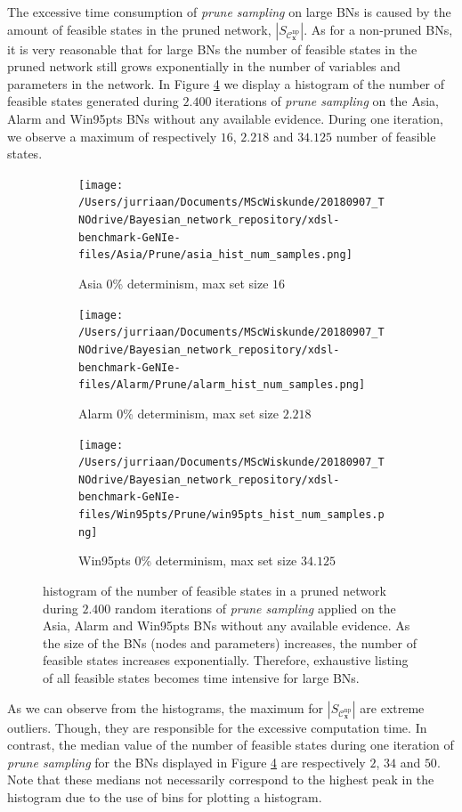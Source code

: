 \documentclass[a4paper, twoside, 11pt]{report}
\newcommand{\bfx}{{\mathbf{x}}}
\newcommand{\C}{{\mathcal C}}
\theoremstyle{plain}
\theoremstyle{definition}
\theoremstyle{remark}
\newcommand{\ps}{\textit{prune sampling }}
\begin{document}
The excessive time consumption of \ps on large BNs is caused by the amount of feasible states in the pruned network, $|S_{\C_\bfx^{\text{np}}}|$. As for a non-pruned BNs, it is very reasonable that for large BNs the number of feasible states in the pruned network still grows exponentially in the number of variables and parameters in the network. In Figure \ref{results4} we display a histogram of the number of feasible states generated during $2.400$ iterations of \ps on the Asia, Alarm and Win95pts BNs without any available evidence. During one iteration, we observe a maximum of respectively $16$, $2.218$ and $34.125$ number of feasible states.
\begin{figure}[h!]
\centering
\captionsetup[subfigure]{justification=centering}

\begin{subfigure}{.3\linewidth}
\texttt{[image: /Users/jurriaan/Documents/MScWiskunde/20180907\_TNOdrive/Bayesian\_network\_repository/xdsl-benchmark-GeNIe-files/Asia/Prune/asia\_hist\_num\_samples.png]}
\caption{Asia 0\% determinism, max set size $16$}%
\label{asia_ev}%
\end{subfigure}\hfill%
\begin{subfigure}{.3\linewidth}
\texttt{[image: /Users/jurriaan/Documents/MScWiskunde/20180907\_TNOdrive/Bayesian\_network\_repository/xdsl-benchmark-GeNIe-files/Alarm/Prune/alarm\_hist\_num\_samples.png]}
\caption{Alarm 0\% determinism, max set size $2.218$}%
\label{alarm_ev}%
\end{subfigure}\hfill%
\begin{subfigure}{.3\linewidth}
\texttt{[image: /Users/jurriaan/Documents/MScWiskunde/20180907\_TNOdrive/Bayesian\_network\_repository/xdsl-benchmark-GeNIe-files/Win95pts/Prune/win95pts\_hist\_num\_samples.png]}
\caption{Win95pts 0\% determinism, max set size $34.125$}%
\label{win95pts_ev}%
\end{subfigure}\hfill%
\vspace{0.75pc}
\caption{histogram of the number of feasible states in a pruned network during $2.400$ random iterations of \ps applied on the Asia, Alarm and Win95pts BNs without any available evidence. As the size of the BNs (nodes and parameters) increases, the number of feasible states increases exponentially. Therefore, exhaustive listing of all feasible states becomes time intensive for large BNs.}
\label{results4}
\end{figure}\newpage
As we can observe from the histograms, the maximum for $|S_{\C_\bfx^{\text{np}}}|$ are extreme outliers. Though, they are responsible for the excessive computation time. In contrast, the median value of the number of feasible states during one iteration of \ps for the BNs displayed in Figure \ref{results4} are respectively $2$, $34$ and $50$. Note that these medians not necessarily correspond to the highest peak in the histogram due to the use of bins for plotting a histogram.\\
\end{document}
